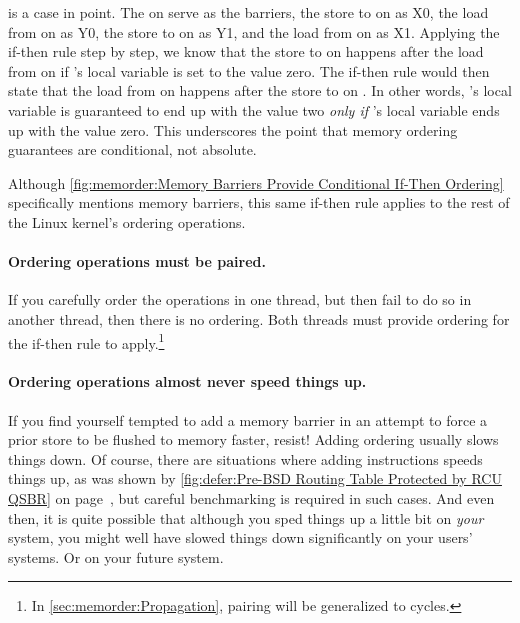 \QuickQuizEnd

\begin{fcvref}
is a case in point.
The  on  serve as the barriers,
the store to  on  as X0, the load from 
on  as Y0, the store to  on  as Y1,
and the load from  on  as X1.
Applying the if-then rule step by step, we know that the store to
 on  happens after the load from  on  if
's local variable  is set to the value zero.
The if-then rule would then state that the load from  on
 happens after the store to  on .
In other words,
's local variable  is guaranteed
to end up with the value two \emph{only if}
's local variable  ends up with the value zero.
This underscores the point that memory ordering guarantees are
conditional, not absolute.
\end{fcvref}

Although
\cref{fig:memorder:Memory Barriers Provide Conditional If-Then Ordering}
specifically mentions memory barriers, this same if-then rule applies
to the rest of the Linux kernel's ordering operations.

\paragraph{Ordering operations must be paired.}
If you carefully order the operations in one thread, but then fail to do
so in another thread, then there is no ordering.
Both threads must provide ordering for the if-then rule to apply.\footnote{
	In \cref{sec:memorder:Propagation}, pairing will be
	generalized to cycles.}

\paragraph{Ordering operations almost never speed things up.}
If you find yourself tempted to add a memory barrier in an attempt
to force a prior store to be flushed to memory faster, resist!
Adding ordering usually slows things down.
Of course, there are situations where adding instructions speeds things
up, as was shown by
\cref{fig:defer:Pre-BSD Routing Table Protected by RCU QSBR} on
page~\pageref{fig:defer:Pre-BSD Routing Table Protected by RCU QSBR},
but careful benchmarking is required in such cases.
And even then, it is quite possible that although you sped things up
a little bit on \emph{your} system, you might well have slowed things
down significantly on your users' systems.
Or on your future system.

